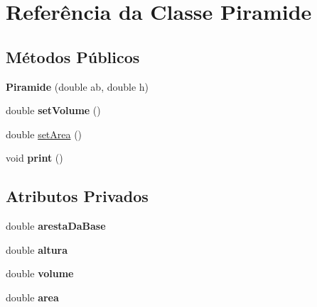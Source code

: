 \hypertarget{classPiramide}{}\section{Referência da Classe Piramide}
\label{classPiramide}
\subsection*{Métodos Públicos}
\begin{DoxyCompactItemize}
\item 
{\bfseries Piramide} (double ab, double h)\hypertarget{classPiramide_a00386f48b7b3b382fe35e290f0caf9b5}{}\label{classPiramide_a00386f48b7b3b382fe35e290f0caf9b5}

\item 
double {\bfseries set\+Volume} ()\hypertarget{classPiramide_a63586af5bffe769ebc981ede24def804}{}\label{classPiramide_a63586af5bffe769ebc981ede24def804}

\item 
double \hyperlink{classPiramide_a08c390c8670290e6f5cb9caf0f8db0e7}{set\+Area} ()
\item 
void {\bfseries print} ()\hypertarget{classPiramide_a3fed808152fbbe33953df69395c320aa}{}\label{classPiramide_a3fed808152fbbe33953df69395c320aa}

\end{DoxyCompactItemize}
\subsection*{Atributos Privados}
\begin{DoxyCompactItemize}
\item 
double {\bfseries aresta\+Da\+Base}\hypertarget{classPiramide_af9ab44636906c87336bfef736d58334a}{}\label{classPiramide_af9ab44636906c87336bfef736d58334a}

\item 
double {\bfseries altura}\hypertarget{classPiramide_aef98b34084e52ebe4f8019c9e40039ae}{}\label{classPiramide_aef98b34084e52ebe4f8019c9e40039ae}

\item 
double {\bfseries volume}\hypertarget{classPiramide_a176868613f38fa3ee3ab8350ae3a12ae}{}\label{classPiramide_a176868613f38fa3ee3ab8350ae3a12ae}

\item 
double {\bfseries area}\hypertarget{classPiramide_a2f972e2f9c1c1655074b0da47d5ff84f}{}\label{classPiramide_a2f972e2f9c1c1655074b0da47d5ff84f}

\end{DoxyCompactItemize}


